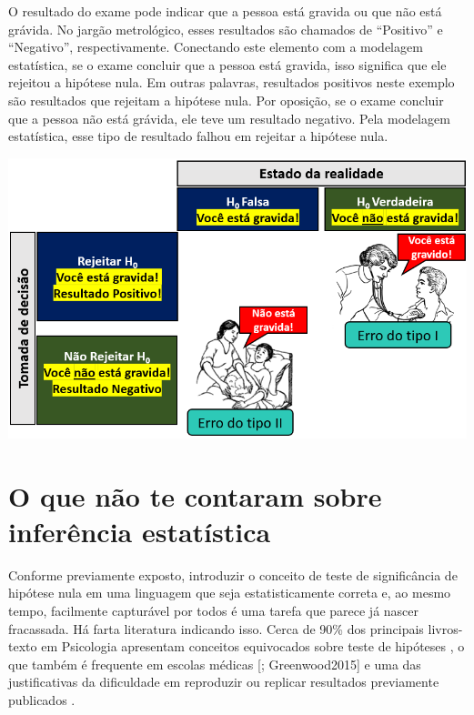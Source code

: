 \documentclass[
]{book}
\begin{document}
O resultado do exame pode indicar que a pessoa está gravida ou que não está grávida. No jargão metrológico, esses resultados são chamados de ``Positivo'' e ``Negativo'', respectivamente. Conectando este elemento com a modelagem estatística, se o exame concluir que a pessoa está gravida, isso significa que ele rejeitou a hipótese nula. Em outras palavras, resultados positivos neste exemplo são resultados que rejeitam a hipótese nula. Por oposição, se o exame concluir que a pessoa não está grávida, ele teve um resultado negativo. Pela modelagem estatística, esse tipo de resultado falhou em rejeitar a hipótese nula.

\includegraphics{./img/cap_inferencia_tabela_decisao2.png}

\hypertarget{o-que-nuxe3o-te-contaram-sobre-inferuxeancia-estatuxedstica}{%
\section{O que não te contaram sobre inferência estatística}\label{o-que-nuxe3o-te-contaram-sobre-inferuxeancia-estatuxedstica}}

Conforme previamente exposto, introduzir o conceito de teste de significância de hipótese nula em uma linguagem que seja estatisticamente correta e, ao mesmo tempo, facilmente capturável por todos é uma tarefa que parece já nascer fracassada. Há farta literatura indicando isso. Cerca de 90\% dos principais livros-texto em Psicologia apresentam conceitos equivocados sobre teste de hipóteses \citep{Cassidy2019}, o que também é frequente em escolas médicas {[}\citet{OcaaRiola2016}; Greenwood2015{]} e uma das justificativas da dificuldade em reproduzir ou replicar resultados previamente publicados \citep{Motulsky2014}.
\end{document}
